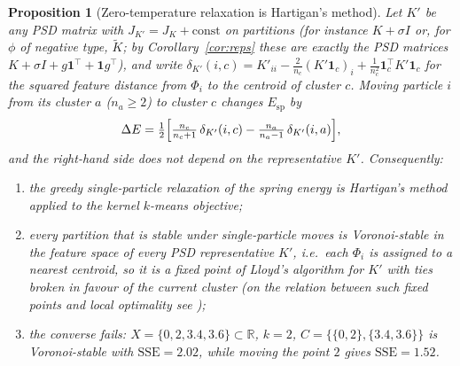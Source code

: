 \documentclass[11pt,a4paper]{article}
\theoremstyle{plain}
\newtheorem{proposition}[theorem]{Proposition}
\theoremstyle{definition}
\theoremstyle{remark}
\newcommand{\R}{\mathbb{R}}
\newcommand{\SSE}{\mathrm{SSE}}
\newcommand{\spec}{\mathrm{sp}}
\newcommand{\one}{\mathbf 1}
\begin{document}
\begin{proposition}[Zero-temperature relaxation is Hartigan's method]\label{prop:hartigan}
Let $K'$ be any PSD matrix with $J_{K'}=J_K+\mathrm{const}$ on partitions (for instance $K+\sigma I$ or, for $\phi$ of negative type, $\widetilde K$; by Corollary~\ref{cor:reps} these are exactly the PSD matrices $K+\sigma I+g\one^{\!\top}+\one g^{\!\top}$), and write $\delta_{K'}(i,c)=K'_{ii}-\tfrac2{n_c}(K'\one_c)_i+\tfrac1{n_c^2}\one_c^{\!\top}K'\one_c$ for the squared feature distance from $\Phi_i$ to the centroid of cluster $c$. Moving particle $i$ from its cluster $a$ ($n_a\ge2$) to cluster $c$ changes $E_\spec$ by
\begin{equation}\label{eq:delta}
\Delta E=\tfrac12\Bigl[\tfrac{n_c}{n_c+1}\,\delta_{K'}(i,c)-\tfrac{n_a}{n_a-1}\,\delta_{K'}(i,a)\Bigr],
\end{equation}
and the right-hand side does not depend on the representative $K'$. Consequently:
\begin{enumerate}[label=(\roman*),leftmargin=2em]
\item the greedy single-particle relaxation of the spring energy is Hartigan's method~\citep{hartigan1975,hartiganwong1979} applied to the kernel $k$-means objective;
\item every partition that is stable under single-particle moves is Voronoi-stable in the feature space of every PSD representative $K'$, i.e.\ each $\Phi_i$ is assigned to a nearest centroid, so it is a fixed point of Lloyd's algorithm for $K'$ with ties broken in favour of the current cluster (on the relation between such fixed points and local optimality see \citealp{selim1984});
\item the converse fails: $X=\{0,2,3.4,3.6\}\subset\R$, $k=2$, $C=\{\{0,2\},\{3.4,3.6\}\}$ is Voronoi-stable with $\SSE=2.02$, while moving the point $2$ gives $\SSE=1.52$.
\end{enumerate}
\end{proposition}
\end{document}
